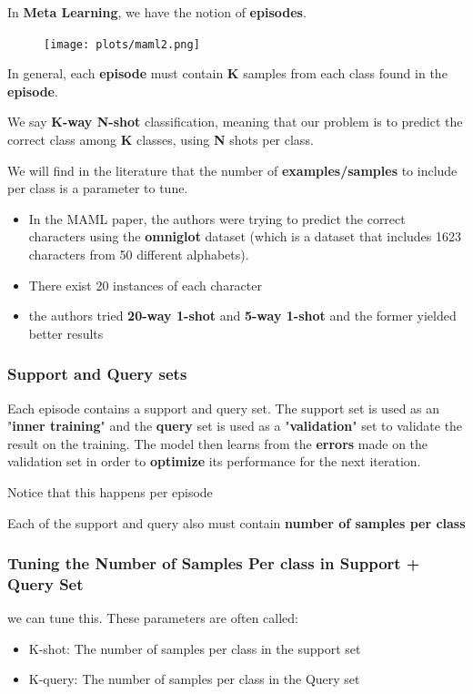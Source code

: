 \documentclass{article}
\begin{document}
\noindent In \textbf{Meta Learning}, we have the notion of \textbf{episodes}.

\begin{figure}[H]
\centering
\texttt{[image: plots/maml2.png]}
\end{figure}

\noindent In general, each \textbf{episode} must contain \textbf{K} samples from each class found in the \textbf{episode}.

We say \textbf{K-way N-shot} classification, meaning that our problem is to predict the correct class among \textbf{K} classes, using \textbf{N} shots per class.

We will find in the literature that the number of \textbf{examples/samples} to include per class is a parameter to tune.

\begin{itemize}
    \item In the MAML paper, the authors were trying to predict the correct characters using the \textbf{omniglot} dataset (which is a dataset that includes 1623 characters from 50 different alphabets).
    \item There exist 20 instances of each character
    \item the authors tried \textbf{20-way 1-shot} and \textbf{5-way 1-shot} and the former yielded better results
\end{itemize}

\subsubsection*{Support and Query sets}
Each episode contains a support and query set. The support set is used as an "\textbf{inner training}" and the \textbf{query} set is used as a "\textbf{validation}" set to validate the result on the training.  The model then learns from the \textbf{errors} made on the validation set in order to \textbf{optimize} its performance for the next iteration.

Notice that this happens per episode

\noindent Each of the support and query also must contain \textbf{number of samples per class}

\subsubsection*{Tuning the Number of Samples Per class in Support + Query Set}
we can tune this. These parameters are often called:
\begin{itemize}
    \item K-shot: The number of samples per class in the support set
    \item K-query: The number of samples per class in the Query set
\end{itemize}
\end{document}
